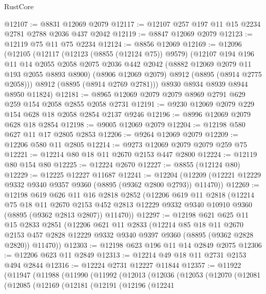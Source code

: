 \begin{lexlean}{RustCore}
\begin{coremodule}
@12107 := @8831 @12069 @2079
@12117 := @12107 @257 @197 @11 @15 @2234 @2781 @2788 @2036 @437 @2042
@12119 := @8847 @12069 @2079
@12123 := @12119 @75 @11 @75 @2234
@12124 := @8856 @12069
@12169 := @12096
    (@12105
      (@12117
        (@12123 (@8855 (@12124 @75)) @9579)
        (@12107
          @194
          @196
          @11
          @14
          @2055
          @2058
          @2075
          @2036
          @442
          @2042
          (@8882 @12069 @2079 @11 @193 @2055 @8893 @8900)
          (@8906 @12069 @2079)
          @8912
          (@8895 (@8914 @2775 @2058)))
        @8912
        (@8895 (@8914 @2769 @2781)))
      @8930
      @8934
      @8939
      @8944
      @8950
      @11824)
@12181 := @8965 @12069 @2079 @2079 @8969 @2791 @629 @259 @154 @2058 @2855 @2058 @2731
@12191 := @9230 @12069 @2079 @229 @154 @628 @18 @2058 @2854 @2137 @9246
@12196 := @8996 @12069 @2079 @628 @18 @2854
@12198 := @9005 @12069 @2079
@12204 := @12198 @580 @627 @11 @17 @2805 @2853
@12206 := @9264 @12069 @2079
@12209 := @12206 @580 @11 @2805
@12214 := @9273 @12069 @2079 @2079 @259 @75
@12221 := @12214 @80 @18 @11 @2670 @2153 @447 @2800
@12224 := @12119 @80 @154 @80
@12225 := @12224 @2670
@12227 := @8855 (@12124 @80)
@12229 := @12225 @12227 @11687
@12241 := @12204 (@12209 (@12221 @12229 @9332 @9340 @9357 @9360 (@8895 (@9362 @2800 @2793)) @11470))
@12269 := @12198
    @619
    @626
    @11
    @16
    @2818
    @2852
    (@12206
      @619
      @11
      @2818
      (@12214
        @75
        @18
        @11
        @2670
        @2153
        @452
        @2813
        @12229
        @9332
        @9340
        @10910
        @9360
        (@8895 (@9362 @2813 @2807))
        @11470))
@12297 := @12198
    @621
    @625
    @11
    @15
    @2833
    @2851
    (@12206
      @621
      @11
      @2833
      (@12214
        @85
        @18
        @11
        @2670
        @2153
        @457
        @2828
        @12229
        @9332
        @9340
        @9397
        @9360
        (@8895 (@9362 @2828 @2820))
        @11470))
@12303 := @12198 @623 @196 @11 @14 @2849 @2075
@12306 := @12206 @623 @11 @2849
@12313 := @12214 @49 @18 @11 @2731 @2153 @494 @2844
@12316 := @12224 @2731 @12227 @11844
@12357 := @11922
    (@11947
      (@11988
        (@11990
          (@11992
            (@12013
              (@12036
                (@12053
                  (@12070
                    (@12081
                      (@12085
                        (@12169
                          (@12181
                            (@12191
                              (@12196
                                (@12241

\end{coremodule}
\end{lexlean}
